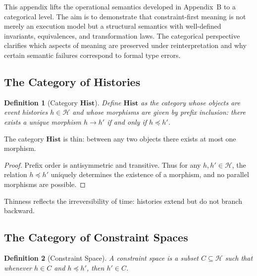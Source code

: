 \documentclass[11pt]{article}
\newtheorem{definition}{Definition}
\begin{document}
This appendix lifts the operational semantics developed in Appendix~B to a
categorical level. The aim is to demonstrate that constraint-first meaning is not
merely an execution model but a structural semantics with well-defined invariants,
equivalences, and transformation laws. The categorical perspective clarifies which
aspects of meaning are preserved under reinterpretation and why certain semantic
failures correspond to formal type errors.

\subsection{The Category of Histories}

\begin{definition}[Category $\mathbf{Hist}$]
Define $\mathbf{Hist}$ as the category whose objects are event histories
$h \in \mathcal{H}$ and whose morphisms are given by prefix inclusion: there
exists a unique morphism $h \to h'$ if and only if $h \preceq h'$.
\end{definition}

\begin{lemma}[Thinness]
The category $\mathbf{Hist}$ is thin: between any two objects there exists at most
one morphism.
\end{lemma}

\begin{proof}
Prefix order is antisymmetric and transitive. Thus for any $h,h' \in \mathcal{H}$,
the relation $h \preceq h'$ uniquely determines the existence of a morphism, and
no parallel morphisms are possible.
\end{proof}

Thinness reflects the irreversibility of time: histories extend but do not branch
backward.

\subsection{The Category of Constraint Spaces}

\begin{definition}[Constraint Space]
A constraint space is a subset $C \subseteq \mathcal{H}$ such that whenever
$h \in C$ and $h \preceq h'$, then $h' \in C$.
\end{definition}
\end{document}
